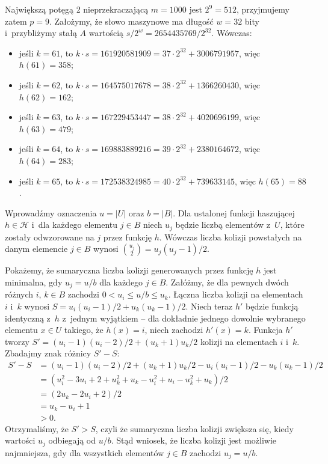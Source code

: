 \exercise %
Największą potęgą 2 nieprzekraczającą $m=1000$ jest $2^9=512$, przyjmujemy zatem $p=9$.
Założymy, że słowo maszynowe ma długość $w=32$ bity i~przybliżymy stałą $A$ wartością $s/2^w=2654435769/2^{32}$.
Wówczas:
\begin{itemize}
	\item jeśli $k=61$, to $k\cdot s=161920581909=37\cdot2^{32}+3006791957$, więc $h(61)=358$;
	\item jeśli $k=62$, to $k\cdot s=164575017678=38\cdot2^{32}+1366260430$, więc $h(62)=162$;
	\item jeśli $k=63$, to $k\cdot s=167229453447=38\cdot2^{32}+4020696199$, więc $h(63)=479$;
	\item jeśli $k=64$, to $k\cdot s=169883889216=39\cdot2^{32}+2380164672$, więc $h(64)=283$;
	\item jeśli $k=65$, to $k\cdot s=172538324985=40\cdot2^{32}+739633145$, więc $h(65)=88$.
\end{itemize}

\exercise %
Wprowadźmy oznaczenia $u=|U|$ oraz $b=|B|$.
Dla ustalonej funkcji haszującej $h\in\mathcal{H}$ i~dla każdego elementu $j\in B$ niech $u_j$ będzie liczbą elementów z~$U$, które zostały odwzorowane na $j$ przez funkcję $h$.
Wówczas liczba kolizji powstałych na danym elemencie $j\in B$ wynosi $\binom{u_j}{2}=u_j(u_j-1)/2$.

Pokażemy, że sumaryczna liczba kolizji generowanych przez funkcję $h$ jest minimalna, gdy $u_j=u/b$ dla każdego $j\in B$.
Załóżmy, że dla pewnych dwóch różnych $i$, $k\in B$ zachodzi $0<u_i\le u/b\le u_k$.
Łączna liczba kolizji na elementach $i$ i~$k$ wynosi $S=u_i(u_i-1)/2+u_k(u_k-1)/2$.
Niech teraz $h'$ będzie funkcją identyczną z~$h$ z~jednym wyjątkiem -- dla dokładnie jednego dowolnie wybranego elementu $x\in U$ takiego, że $h(x)=i$, niech zachodzi $h'(x)=k$.
Funkcja $h'$ tworzy $S'=(u_i-1)(u_i-2)/2+(u_k+1)u_k/2$ kolizji na elementach $i$ i~$k$.
Zbadajmy znak różnicy $S'-S$:
\begin{align*}
	S'-S &= (u_i-1)(u_i-2)/2+(u_k+1)u_k/2-u_i(u_i-1)/2-u_k(u_k-1)/2 \\
	&= (u_i^2-3u_i+2+u_k^2+u_k-u_i^2+u_i-u_k^2+u_k)/2 \\
	&= (2u_k-2u_i+2)/2 \\
	&= u_k-u_i+1 \\
	&> 0.
\end{align*}
Otrzymaliśmy, że $S'>S$, czyli że sumaryczna liczba kolizji zwiększa się, kiedy wartości $u_j$ odbiegają od $u/b$.
Stąd wniosek, że liczba kolizji jest możliwie najmniejsza, gdy dla wszystkich elementów $j\in B$ zachodzi $u_j=u/b$.

